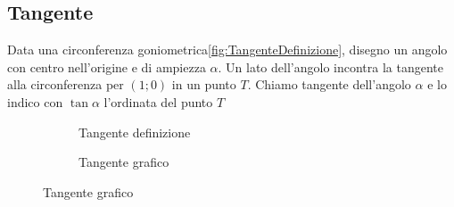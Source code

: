 \subsection{Tangente}
\begin{definizione}[Tangente]
	Data una circonferenza goniometrica\nobs\vref{fig:TangenteDefinizione}, disegno un angolo con centro nell'origine e di ampiezza $\alpha$. Un lato dell'angolo incontra la tangente  alla circonferenza  per $(1;0)$ in un punto $T$.  Chiamo tangente dell'angolo $\alpha$ e lo indico con $\tan\alpha$ l'ordinata  del punto $T$
\end{definizione}
\label{sec:Tangente}
\begin{figure}
	\begin{subfigure}[b]{.5\linewidth}
		\centering
			
		\caption{Tangente definizione}\label{fig:TangenteDefinizione}
	\end{subfigure}%
	\begin{subfigure}[b]{.5\linewidth}
		\centering
		\caption{Tangente grafico}\label{fig:TangenteGrafico}
	\end{subfigure}
	\label{tab:funztg}
\end{figure}
